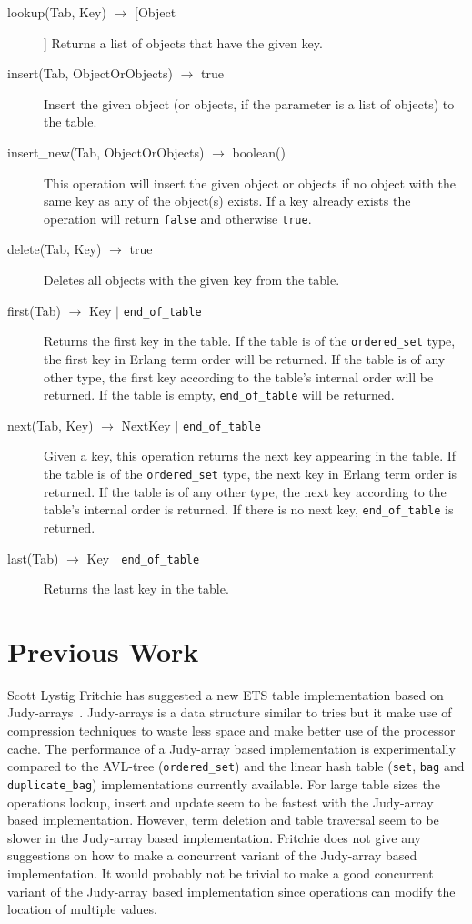 \documentclass[aps,pre,preprint,nofootinbib]{revtex4}
\begin{document}
\begin{description}
\item[lookup(Tab, Key) $\rightarrow$ [Object]]
  Returns a list of objects that have the given key.
\item[insert(Tab, ObjectOrObjects) $\rightarrow$ true]
  Insert the given object (or objects, if the parameter is a list of objects) to the table.
\item[insert\_new(Tab, ObjectOrObjects) $\rightarrow$ boolean()]
  This operation will insert the given object or objects if no object with the same key as any of the object(s) exists.
  If a key already exists the operation will return \verb|false| and otherwise \verb|true|.
\item[delete(Tab, Key) $\rightarrow$ true]
  Deletes all objects with the given key from the table.
\item[first(Tab) $\rightarrow$ Key $|$ \texttt{end\_of\_table}]
  Returns the first key in the table.
  If the table is of the \verb|ordered_set| type, the first key in Erlang term order will be returned.
  If the table is of any other type, the first key according to the table's internal order will be returned.
  If the table is empty, \verb|end_of_table| will be returned.
\item[next(Tab, Key) $\rightarrow$ NextKey $|$ \texttt{end\_of\_table}]
  Given a key, this operation returns the next key appearing in the table.
  If the table is of the \verb|ordered_set| type, the next key in Erlang term order is returned.
  If the table is of any other type, the next key according to the table's internal order is returned.
  If there is no next key, \texttt{end\_of\_table} is returned.
\item[last(Tab) $\rightarrow$ Key $|$ \texttt{end\_of\_table}] Returns the last key in the table.
\end{description}

\section{Previous Work}

Scott Lystig Fritchie has suggested a new ETS table implementation based on Judy-arrays~\cite{ScottEtsJudy}.
Judy-arrays is a data structure similar to tries but it make use of compression techniques to waste less space and make better use of the processor cache.
The performance of a Judy-array based implementation is experimentally compared to the AVL-tree (\verb|ordered_set|) and the linear hash table (\verb|set|, \verb|bag| and \verb|duplicate_bag|) implementations currently available.
For large table sizes the operations lookup, insert and update seem to be fastest with the Judy-array based implementation.
However, term deletion and table traversal seem to be slower in the Judy-array based implementation.
Fritchie does not give any suggestions on how to make a concurrent variant of the Judy-array based implementation.
It would probably not be trivial to make a good concurrent variant of the Judy-array based implementation since operations can modify the location of multiple values.
\end{document}
